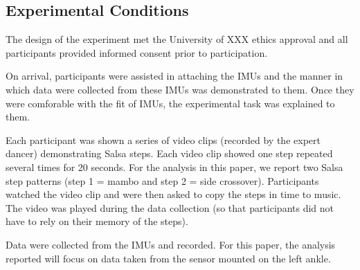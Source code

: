 \documentclass{sigchi}
\begin{document}
\subsection{Experimental Conditions}
The design of the experiment met the University of XXX ethics approval and all participants provided informed 
consent prior to participation.

On arrival, participants were assisted in attaching the IMUs and the manner in which data were collected 
from these IMUs was demonstrated to them.  Once they were comforable with the fit of IMUs, 
the experimental task was explained to them.  

Each participant was shown a series of video clips (recorded by the expert dancer) demonstrating Salsa steps.  
Each video clip showed one step repeated several times for 20 seconds.  For the analysis in this paper, 
we report two Salsa step patterns (step 1 = mambo and step 2 = side crossover).  
Participants watched the video clip and were then asked to copy the steps in time to music.  
The video was played during the data collection 
(so that participants did not have to rely on their memory of the steps).

Data were collected from the IMUs and recorded.  
For this paper, the analysis reported will focus on data taken from the sensor mounted on the left ankle. 
\end{document}
